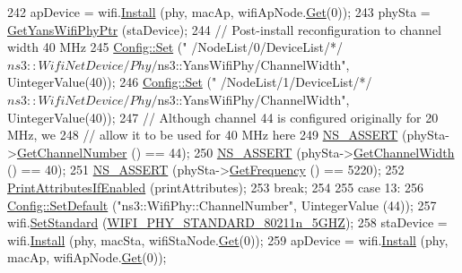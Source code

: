 \begin{DoxyCode}
242       apDevice = wifi.\hyperlink{classns3_1_1WifiHelper_a451b3d33fa1497c22f06c5451f57a127}{Install} (phy, macAp, wifiApNode.\hyperlink{classns3_1_1NodeContainer_a9ed96e2ecc22e0f5a3d4842eb9bf90bf}{Get}(0));
243       phySta = \hyperlink{wifi-phy-configuration_8cc_a50ec12cbf31121934173cb4a44215e73}{GetYansWifiPhyPtr} (staDevice);
244       \textcolor{comment}{// Post-install reconfiguration to channel width 40 MHz}
245       \hyperlink{group__config_gadce03667ec621d64ce4aace85d9bcfd0}{Config::Set} (\textcolor{stringliteral}{"
      /NodeList/0/DeviceList/*/$ns3::WifiNetDevice/Phy/$ns3::YansWifiPhy/ChannelWidth"}, UintegerValue(40));
246       \hyperlink{group__config_gadce03667ec621d64ce4aace85d9bcfd0}{Config::Set} (\textcolor{stringliteral}{"
      /NodeList/1/DeviceList/*/$ns3::WifiNetDevice/Phy/$ns3::YansWifiPhy/ChannelWidth"}, UintegerValue(40));
247       \textcolor{comment}{// Although channel 44 is configured originally for 20 MHz, we }
248       \textcolor{comment}{// allow it to be used for 40 MHz here}
249       \hyperlink{assert_8h_a6dccdb0de9b252f60088ce281c49d052}{NS\_ASSERT} (phySta->\hyperlink{classns3_1_1WifiPhy_a5cf0ccf06109ace61db51c83e91b7e8d}{GetChannelNumber} () == 44);
250       \hyperlink{assert_8h_a6dccdb0de9b252f60088ce281c49d052}{NS\_ASSERT} (phySta->\hyperlink{classns3_1_1WifiPhy_a4a5d5009b3b3308f2baeed42a2007189}{GetChannelWidth} () == 40);
251       \hyperlink{assert_8h_a6dccdb0de9b252f60088ce281c49d052}{NS\_ASSERT} (phySta->\hyperlink{classns3_1_1WifiPhy_ad2508d94faf22d690d6b8b4367934fd1}{GetFrequency} () == 5220);
252       \hyperlink{wifi-phy-configuration_8cc_a73f0822e1f64b23097cbff2fc565842f}{PrintAttributesIfEnabled} (printAttributes);
253       \textcolor{keywordflow}{break};
254 
255     \textcolor{keywordflow}{case} 13:
256       \hyperlink{group__config_ga2e7882df849d8ba4aaad31c934c40c06}{Config::SetDefault} (\textcolor{stringliteral}{"ns3::WifiPhy::ChannelNumber"}, UintegerValue (44));
257       wifi.\hyperlink{classns3_1_1WifiHelper_aa54f3e61527ef8de318d310045bc5dfd}{SetStandard} (\hyperlink{group__wifi_gga1299834f4e1c615af3ca738033b76a49aaabe94a0be4668583c42595437b4a6c0}{WIFI\_PHY\_STANDARD\_80211n\_5GHZ});
258       staDevice = wifi.\hyperlink{classns3_1_1WifiHelper_a451b3d33fa1497c22f06c5451f57a127}{Install} (phy, macSta, wifiStaNode.\hyperlink{classns3_1_1NodeContainer_a9ed96e2ecc22e0f5a3d4842eb9bf90bf}{Get}(0));
259       apDevice = wifi.\hyperlink{classns3_1_1WifiHelper_a451b3d33fa1497c22f06c5451f57a127}{Install} (phy, macAp, wifiApNode.\hyperlink{classns3_1_1NodeContainer_a9ed96e2ecc22e0f5a3d4842eb9bf90bf}{Get}(0));

\end{DoxyCode}
